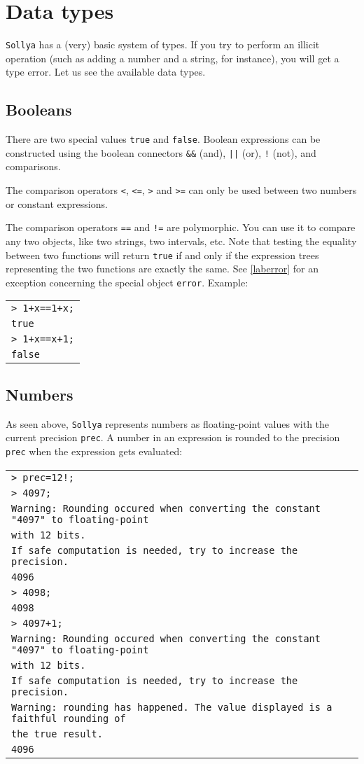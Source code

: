 \documentclass[a4paper]{article}
\newcommand{\com}[1]{\texttt{#1}}
\newcommand{\key}[1]{\texttt{#1}}
\newcommand{\sollya}{\texttt{Sollya}\xspace}
\newcommand{\code}[1]{
\begin{center}
\begin{tabular}{|p{14.8cm}|}
\hline
#1
\hline
\end{tabular}
\end{center}
}
\newcommand{\ligne}[1]{\texttt{#1}\\}
\begin{document}
\section{Data types}
\sollya has a (very) basic system of types. If you try to perform an illicit operation (such as adding a number and a string, for instance), you will get a type error. Let us see the available data types.

\subsection{Booleans}
There are two special values \key{true} and \key{false}. Boolean expressions can be constructed using the boolean connectors \key{\&\&} (and), \key{||} (or), \key{!} (not), and comparisons.

The comparison operators \key{<}, \key{<=}, \key{>} and \key{>=} can only be used between two numbers or constant expressions.

The comparison operators \key{==} and \key{!=} are polymorphic. You can use it to compare any two objects, like two strings, two intervals, etc. Note that testing the equality between two functions will return \key{true} if and only if the expression trees representing the two functions are exactly the same. See \ref{laberror} for an exception concerning the special object \key{error}. Example:

\code{
\ligne{> 1+x==1+x;}
\ligne{true}
\ligne{> 1+x==x+1;}
\ligne{false}
}

\subsection{Numbers}
As seen above, \sollya represents numbers as floating-point values with the current precision \com{prec}. A number in an expression is rounded to the precision \com{prec} when the expression gets evaluated:

\code{
\ligne{> prec=12!;}
\ligne{> 4097;}
\ligne{Warning: Rounding occured when converting the constant "4097" to floating-point}
\ligne{with 12 bits.}
\ligne{If safe computation is needed, try to increase the precision.}
\ligne{4096}
\ligne{> 4098;}
\ligne{4098}
\ligne{> 4097+1;}
\ligne{Warning: Rounding occured when converting the constant "4097" to floating-point}
\ligne{with 12 bits.}
\ligne{If safe computation is needed, try to increase the precision.}
\ligne{Warning: rounding has happened. The value displayed is a faithful rounding of}
\ligne{the true result.}
\ligne{4096}
}
\end{document}
